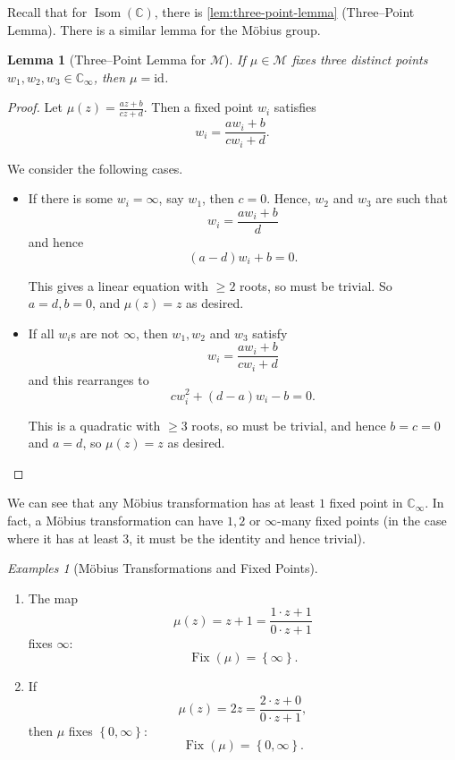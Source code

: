 \documentclass{article}
\newtheorem{lemma}[theorem]{Lemma}
\theoremstyle{definition}
\theoremstyle{remark}
\newcommand{\pqty}[1]{\left(#1\right)}
\newcommand{\Bqty}[1]{\left\{#1\right\}}
\newcommand{\identity}{\mathrm{id}}
\newcommand{\CC}{\mathbb{C}}
\newtheorem*{examples*}{Examples}
\newcommand{\compactify}{_{\infty}}
\newcommand{\mobius}{\mathcal{M}}
\newcommand{\Fix}{\operatorname{Fix}}
\newcommand{\Isom}{\operatorname{Isom}}
\begin{document}
Recall that for \(\Isom\pqty{\CC}\), there is \autoref{lem:three-point-lemma} (Three--Point Lemma). There is a similar lemma for the M\"{o}bius group.

\begin{lemma}[Three--Point Lemma for \(\mobius\)]
    \label{lem:three-point-mobius}%
    If \(\mu \in \mobius\) fixes three distinct points \(w_1, w_2, w_3 \in \CC\compactify\), then \(\mu = \identity\).
\end{lemma}

\begin{proof}
    Let \(\mu\pqty{z} = \frac{az + b}{cz + d}\). Then a fixed point \(w_i\) satisfies
    \[
        w_i = \frac{a w_i + b}{c w_i + d}.
    \]

    We consider the following cases.

    \begin{itemize}
        \item If there is some \(w_i = \infty\), say \(w_1\), then \(c = 0\). Hence, \(w_2\) and \(w_3\) are such that
        \[
            w_i = \frac{a w_i + b}{d}
        \]
        and hence
        \[
            \pqty{a - d} w_i + b = 0.
        \]

        This gives a linear equation with \(\geq 2\) roots, so must be trivial. So \(a = d, b = 0\), and \(\mu\pqty{z} = z\) as desired.

        \item If all \(w_i\)s are not \(\infty\), then \(w_1, w_2\) and \(w_3\) satisfy
        \[
            w_i = \frac{a w_i + b}{c w_i + d}
        \]
        and this rearranges to
        \[
            c w_i^2 + \pqty{d - a} w_i - b = 0.
        \]

        This is a quadratic with \(\geq 3\) roots, so must be trivial, and hence \(b = c = 0\) and \(a = d\), so \(\mu\pqty{z} = z\) as desired.
    \end{itemize}
\end{proof}

We can see that any M\"{o}bius transformation has at least \(1\) fixed point in \(\CC\compactify\). In fact, a M\"{o}bius transformation can have \(1, 2\) or \(\infty\)-many fixed points (in the case where it has at least \(3\), it must be the identity and hence trivial).

\begin{examples*}[M\"{o}bius Transformations and Fixed Points]
    \begin{enumerate}
        \item The map
        \[
            \mu\pqty{z} = z + 1 = \frac{1 \cdot z + 1}{0 \cdot z + 1}
        \]
        fixes \(\infty\):
        \[
            \Fix\pqty{\mu} = \Bqty{\infty}.
        \]

        \item If
        \[
        \mu\pqty{z} = 2z = \frac{2 \cdot z + 0}{0 \cdot z + 1},
        \]
        then \(\mu\) fixes \(\Bqty{0, \infty}\):
        \[
            \Fix\pqty{\mu} = \Bqty{0, \infty}.
        \]
    \end{enumerate}
\end{examples*}
\end{document}
